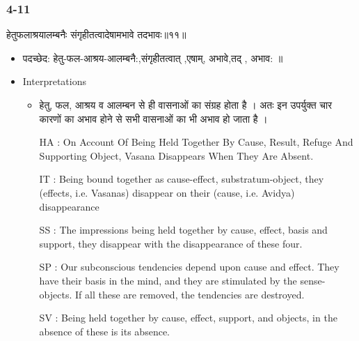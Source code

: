 \begin{frame}[fragile]\frametitle{4-11}
\begin{sanskrit}
हेतुफलाश्रयालम्बनैः संगृहीतत्वादेषामभावे तदभावः॥११॥
\end{sanskrit}

	\begin{itemize}
	\item पदच्छेद:  हेतु-फल-आश्रय-आलम्बनै:,संगृहीतत्वात् ,एषाम्, अभावे,तद् , अभाव: ॥
	\item Interpretations
		\begin{itemize}	
		\item हेतु, फल, आश्रय व आलम्बन से ही वासनाओं का संग्रह होता है । अतः इन उपर्युक्त चार कारणों का अभाव होने से सभी वासनाओं का भी अभाव हो जाता है ।
		\item [HA]: On Account Of Being Held Together By Cause, Result, Refuge And Supporting Object, Vasana Disappears When They Are Absent.
		\item [IT]: Being bound together as cause-effect, substratum-object, they (effects, i.e. Vasanas) disappear on their (cause, i.e. Avidya) disappearance
		\item [SS]: The impressions being held together by cause, effect, basis and support, they disappear with the disappearance of these four.
		\item [SP]: Our subconscious tendencies depend upon cause and effect. They have their basis in the mind, and they are stimulated by the sense-objects. If all these are removed, the tendencies are destroyed.
		\item [SV]: Being held together by cause, effect, support, and objects, in the absence of these is its absence. 
		\end{itemize}
	\end{itemize}
\end{frame}


